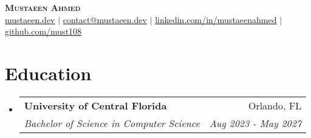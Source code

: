 \documentclass[letterpaper,11pt]{article}
\makeatletter
\newcommand{\resumeSubheading}[4]{
  \vspace{-2pt}\item
    \begin{tabular*}{0.97\textwidth}[t]{l@{\extracolsep{\fill}}r}
      \textbf{#1} & #2 \\
      \textit{\small#3} & \textit{\small #4} \\
    \end{tabular*}\vspace{-7pt}
}
\newcommand{\resumeSubHeadingListStart}{\begin{itemize}[leftmargin=0.15in, label={}]}
\newcommand{\resumeSubHeadingListEnd}{\end{itemize}}
\makeatother
\begin{document}


\begin{center}
    \textbf{\Huge \scshape Mustaeen Ahmed} \\ \vspace{1pt}
    \href{https://mustaeen.dev}{\ul{mustaeen.dev}} $|$ 
    \href{mailto:contact@mustaeen.dev}{\ul{contact@mustaeen.dev}} $|$ 
    \href{https://linkedin.com/in/mustaeenahmed}{\ul{linkedin.com/in/mustaeenahmed}} $|$
    \href{https://github.com/must108}{\ul{github.com/must108}} 
\end{center}


\section{Education}
  \resumeSubHeadingListStart
    \resumeSubheading
      {University of Central Florida}{Orlando, FL}
      {Bachelor of Science in Computer Science}{Aug 2023 - May 2027}
      
  \resumeSubHeadingListEnd

\end{document}
